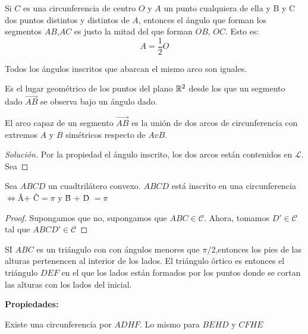 \begin{nprop}
  Si $C$ es una circunferencia de centro $O$ y $A$ un punto cualquiera de ella y B y C dos puntos distintos y distintos de $A$, entonces el ángulo que forman los segmentos $AB$,$AC$ es justo la mitad del que forman $OB$, $OC$. Esto es:
  \[
    A = \dfrac{1}{2} O
  \]
\end{nprop}
\begin{ncor}
  Todos los ángulos inscritos que abarcan el mismo arco son iguales.
\end{ncor}

\begin{ndef}
	Es el lugar geométrico de los puntos del plano $\mathbb{R}^2$ desde los que un segmento dado $\vec{AB}$ se observa bajo un ángulo dado.
\end{ndef}

\begin{ejemplo}
	El arco capaz de un segmento $\vec{AB}$ es la unión de dos arcos de circunferencia con extremos $A$ y $B$ simétricos respecto de $AvB$.

	\begin{proof}[Solución]
	Por la propiedad el ángulo inscrito, los dos arcos están contenidos en $\mathcal L$. Sea

\end{proof}
\end{ejemplo}
\begin{ejemplo}
	Sea $ABCD$ un cuadtrilátero convexo. $ABCD$ está inscrito en una circunferencia $\iff $\^{A}$ +$ \^{C}$ = \pi$ y \^{B} + \^{D} $ = \pi$
	\begin{proof}
	Supongamos que no, supongamos que $ABC \in \mathcal C$. Ahora, tomamos $D' \in \mathcal C$ tal que $ABCD' \in \mathcal C $
\end{proof}
\end{ejemplo}

\begin{ndef}
	SI $ABC$ es un triángulo con con ángulos menores que $\pi/2$,entonces los pies de las alturas pertenencen al interior de los lados. El triángulo órtico es entonces el triángulo $DEF$ en el que los lados están formados por los puntos donde se cortan las alturas con los lados del inicial.
\end{ndef}

\textbf{Propiedades:}\\
\begin{nlist}
	\item Existe una circunferencia por $ADHF$. Lo mismo para $BEHD$ y $CFHE$
\end{nlist}

